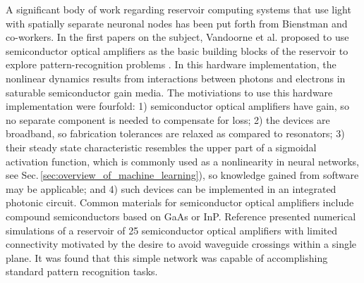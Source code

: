 A significant body of work regarding reservoir computing systems that use light with spatially separate neuronal nodes has been put forth from Bienstman and co-workers. In the first papers on the subject, Vandoorne et al. proposed to use semiconductor optical amplifiers as the basic building blocks of the reservoir to explore pattern-recognition problems \cite{vadi2008,vada2011}. In this hardware implementation, the nonlinear dynamics results from interactions between photons and electrons in saturable semiconductor gain media. The motiviations to use this hardware implementation were fourfold: 1) semiconductor optical amplifiers have gain, so no separate component is needed to compensate for loss; 2) the devices are broadband, so fabrication tolerances are relaxed as compared to resonators; 3) their steady state characteristic resembles the upper part of a sigmoidal activation function, which is commonly used as a nonlinearity in neural networks, see Sec.\,\ref{sec:overview_of_machine_learning}), so knowledge gained from software may be applicable; and 4) such devices can be implemented in an integrated photonic circuit. Common materials for semiconductor optical amplifiers include compound semiconductors based on GaAs or InP. Reference  presented numerical simulations of a reservoir of 25 semiconductor optical amplifiers with limited connectivity motivated by the desire to avoid waveguide crossings within a single plane. It was found that this simple network was capable of accomplishing standard pattern recognition tasks. 

